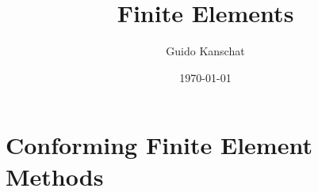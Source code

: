 \usetikzlibrary{svg.path}


\def\constref#1{C_{\text{\ref{#1}}}}
\title{Finite Elements}
\author{Guido Kanschat}
\date{\today}

\def\vecx{\mathbf x}

\maketitle
\tableofcontents
%

%


%

% 

\setcounter{chapter}{3}
\chapter{Conforming Finite Element Methods}
\setcounter{section}{2}




